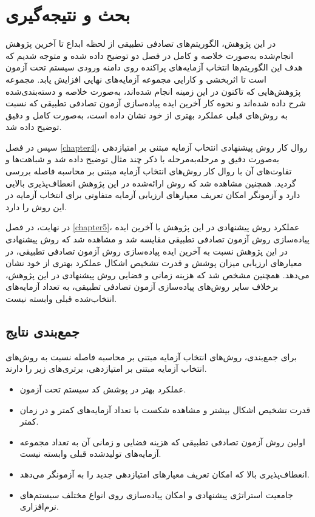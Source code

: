 \chapter{بحث و نتیجه‌گیری}\label{chapter6}

در این پژوهش، الگوریتم‌های تصادفی تطبیقی از لحظه ابداع تا آخرین پژوهش انجام‌شده به‌صورت خلاصه و کامل در فصل دو توضیح داده شده و متوجه شدیم که هدف این الگوریتم‌ها انتخاب آزمایه‌های پراکنده روی دامنه ورودی سیستم تحت آزمون است تا اثربخشی و کارایی مجموعه آزمایه‌های نهایی افزایش یابد.
مجموعه پژوهش‌هایی که تاکنون در این زمینه انجام شده‌اند، به‌صورت خلاصه و دسته‌بندی‌شده شرح داده شده‌اند و نحوه کار آخرین ایده پیاده‌سازی آزمون تصادفی تطبیقی که نسبت به روش‌های قبلی عملکرد بهتری از خود نشان داده است، به‌صورت کامل و دقیق توضیح داده شد.

سپس در فصل \ref{chapter4}، روال کار روش پیشنهادی انتخاب آزمایه مبتنی بر امتیازدهی به‌صورت دقیق و مرحله‌به‌مرحله با ذکر چند مثال توضیح داده شد و شباهت‌ها و تفاوت‌های آن با روال کار روش‌های انتخاب آزمایه مبتنی بر محاسبه فاصله بررسی گردید.
همچنین مشاهده شد که روش ارائه‌شده در این پژوهش انعطاف‌پذیری بالایی دارد و آزمونگر امکان تعریف معیارهای ارزیابی آزمایه متفاوتی برای انتخاب آزمایه در این روش را دارد.

در نهایت، در فصل \ref{chapter5}، عملکرد روش پیشنهادی در این پژوهش با آخرین ایده پیاده‌سازی روش آزمون تصادفی تطبیقی مقایسه شد و مشاهده شد که روش پیشنهادی در این پژوهش نسبت به آخرین ایده پیاده‌سازی روش آزمون تصادفی تطبیقی، در معیارهای ارزیابی میزان پوشش و قدرت تشخیص اشکال عملکرد بهتری از خود نشان می‌دهد. همچنین مشخص شد که هزینه زمانی و فضایی روش پیشنهادی در این پژوهش، برخلاف سایر روش‌های پیاده‌سازی آزمون تصادفی تطبیقی، به تعداد آزمایه‌های انتخاب‌شده قبلی وابسته نیست.
\section{جمع‌بندی نتایج}

برای جمع‌بندی، روش‌های انتخاب آزمایه مبتنی بر محاسبه فاصله نسبت به روش‌های انتخاب آزمایه مبتنی بر امتیازدهی، برتری‌های زیر را دارند.

\begin{itemize}
	
	\item[\checkmark] عملکرد بهتر در پوشش کد سیستم تحت آزمون.
	\item[\checkmark] قدرت تشخیص اشکال بیشتر و مشاهده شکست با تعداد آزمایه‌های کمتر و در زمان کمتر.
	\item[\checkmark] اولین روش آزمون تصادفی تطبیقی که هزینه فضایی و زمانی آن به تعداد مجموعه آزمایه‌های تولیدشده قبلی وابسته نیست.
	\item[\checkmark] انعطاف‌پذیری بالا که امکان تعریف معیارهای امتیازدهی جدید را به آزمونگر می‌دهد.
	\item[\checkmark] جامعیت استراتژی پیشنهادی و امکان پیاده‌سازی روی انواع مختلف سیستم‌های نرم‌افزاری.

\end{itemize}

